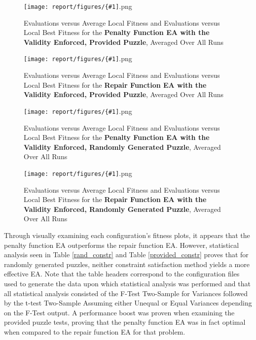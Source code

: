 \documentclass[11pt]{article}
\newcommand{\fitnessplotcaption}[1]{\caption{Evaluations versus Average Local Fitness and Evaluations versus 
    Local Best Fitness for the \textbf{{#1}}, Averaged Over All Runs}}
\newcommand{\addgraphic}[1]{\centerline{\texttt{[image: report/figures/\{\#1]}.png}}}
\begin{document}
\begin{figure}[H]
    \addgraphic{website_puzzle_validity_enforced_graph}
    \fitnessplotcaption{Penalty Function EA with the Validity Enforced, Provided Puzzle}
    \label{fig:website_puzzle_validity_enforced_graph}
\end{figure}

\begin{figure}[H]
    \addgraphic{website_puzzle_validity_enforced_bonus_graph}
    \fitnessplotcaption{Repair Function EA with the Validity Enforced, Provided Puzzle}
    \label{fig:website_puzzle_validity_enforced_bonus_graph}
\end{figure}

\begin{figure}[H]
    \addgraphic{random_gen_validity_enforced_graph}
    \fitnessplotcaption{Penalty Function EA with the Validity Enforced, Randomly Generated Puzzle}
    \label{fig:random_gen_validity_enforced_graph}
\end{figure}

\begin{figure}[H]
    \addgraphic{random_gen_validity_enforced_bonus_graph}
    \fitnessplotcaption{Repair Function EA with the Validity Enforced, Randomly Generated Puzzle}
    \label{fig:random_gen_validity_enforced_bonus_graph}
\end{figure}


Through visually examining each configuration's fitness plots, it appears that the penalty function EA 
outperforms the repair function EA. However, statistical analysis seen in Table \ref{rand_constr} and Table \ref{provided_constr}
proves that for randomly generated puzzles, neither constraint satisfaction method yields a more effective EA. Note that the table
headers correspond to the configuration files used to generate the data upon which statistical analysis was performed and that
all statistical analysis consisted of the F-Test Two-Sample for Variances followed by the t-test Two-Sample Assuming either Unequal or
Equal Variances depending on the F-Test output.
A performance boost was proven when examining the provided puzzle tests, proving that the penalty function EA was in fact
optimal when compared to the repair function EA for that problem. 
\end{document}
